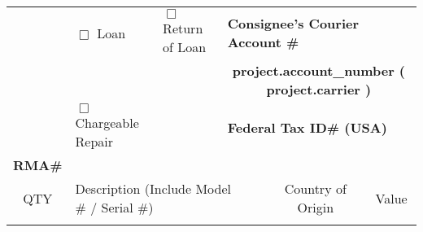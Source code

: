 \documentclass[letterpaper,10pt]{report}
\begin{document}
\begin{center}
{{{\begin{center}
{\begin{tabular}{|l|l|c|c|l|l|c|c|l|c|c|c|}
{{\multicolumn{1}{|l}{ \multirow{5}{*}{}} & 
\multicolumn{4}{l}{ $\Box$ Loan } & \multicolumn{1}{l|}{ $\Box$ Return of Loan } & 
\multicolumn{6}{l|}{ {\bf Consignee's Courier Account \# }} \\
\multicolumn{1}{|l}{} & \multicolumn{4}{c}{} & \multicolumn{1}{l|}{} & \multicolumn{6}{c|}{ {\bf {{ project.account_number }} ({{ project.carrier }}) }} \\ \cline{7-12}

\multicolumn{1}{|l}{ \multirow{5}{*}{}} & 
\multicolumn{4}{l}{ $\Box$ Chargeable Repair } & \multicolumn{1}{l|}{} & 
\multicolumn{6}{l|}{ {\bf Federal Tax ID\# (USA) }} \\
\multicolumn{1}{|l}{ {\bf RMA\# }} & \multicolumn{4}{c}{} & \multicolumn{1}{l|}{} & \multicolumn{6}{c|}{} \\ \hline

\multicolumn{1}{|c|}{ QTY } & \multicolumn{7}{l}{ Description (Include Model \# / Serial \#) } & \multicolumn{1}{p{2cm}|}{} & \multicolumn{1}{c|}{ {\small Country of Origin }} & \multicolumn{2}{c|}{ Value } \\ \hline

}}
\end{tabular}}
\end{center}}}}
\end{center}
\end{document}
